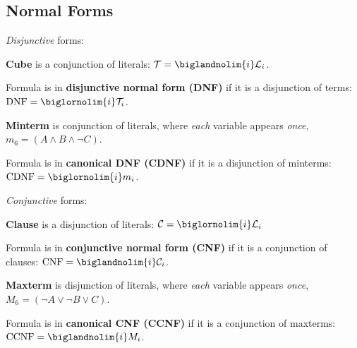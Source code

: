 \documentclass[a4paper,10pt]{article}
\begin{document}
\subsection{Normal Forms}

\begin{terms}
    \item \emph{Disjunctive} forms:
    \begin{terms}
        \item \textbf{Cube} is a conjunction of literals: $\mathcal{T} = \biglandnolim{i} \mathcal{L}_i$.

        \item Formula is in \textbf{disjunctive normal form (DNF)} if it is a disjunction of terms: $\textrm{DNF} = \biglornolim{i} \mathcal{T}_i$.

        \item \textbf{Minterm} is conjunction of literals, where \emph{each} variable appears \emph{once}, \eg $m_6 = (A \land B \land \neg C)$.

        \item Formula is in \textbf{canonical DNF (CDNF)} if it is a disjunction of minterms: $\textrm{CDNF} = \biglornolim{i} m_i$.
    \end{terms}

    \item \emph{Conjunctive} forms:
    \begin{terms}
        \item \textbf{Clause} is a disjunction of literals: $\mathcal{C} = \biglornolim{i} \mathcal{L}_i$

        \item Formula is in \textbf{conjunctive normal form (CNF)} if it is a conjunction of clauses: $\textrm{CNF} = \biglandnolim{i} \mathcal{C}_i$.

        \item \textbf{Maxterm} is disjunction of literals, where \emph{each} variable appears \emph{once}, \eg $M_6 = (\neg A \lor \neg B \lor C)$.

        \item Formula is in \textbf{canonical CNF (CCNF)} if it is a conjunction of maxterms: $\textrm{CCNF} = \biglandnolim{i} M_i$.
    \end{terms}


\end{terms}
\end{document}
